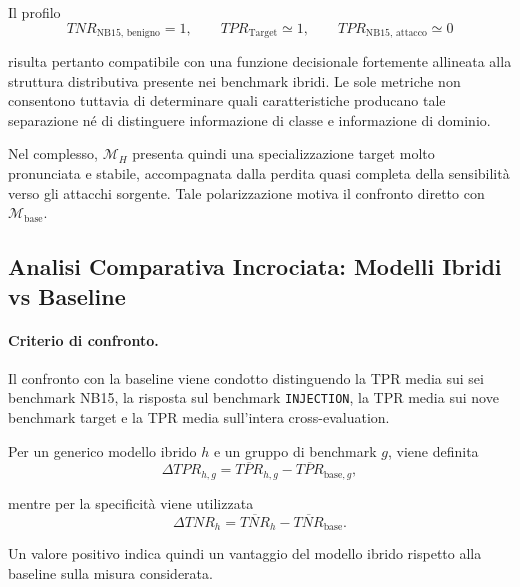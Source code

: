 Il profilo
\[
    TNR_{\text{NB15, benigno}}=1,
    \qquad
    TPR_{\text{Target}}\simeq1,
    \qquad
    TPR_{\text{NB15, attacco}}\simeq0
\]

risulta pertanto compatibile con una funzione decisionale fortemente allineata alla struttura distributiva presente nei benchmark ibridi. 
Le sole metriche non consentono tuttavia di determinare quali caratteristiche producano tale separazione né di distinguere informazione di classe e informazione di dominio.

Nel complesso, $\mathcal{M}_{H}$ presenta quindi una specializzazione target molto pronunciata e stabile, accompagnata dalla perdita quasi completa della sensibilità verso gli attacchi sorgente. 
Tale polarizzazione motiva il confronto diretto con $\mathcal{M}_{\mathrm{base}}$.



\subsection{Analisi Comparativa Incrociata: Modelli Ibridi vs Baseline}
\label{subsec:analisi_incrociata_ibridi_baseline}

\paragraph{Criterio di confronto.}
Il confronto con la baseline viene condotto distinguendo la TPR media sui sei benchmark NB15, la risposta sul benchmark \texttt{INJECTION}, la TPR media sui nove benchmark target e la TPR media sull'intera cross-evaluation.

Per un generico modello ibrido $h$ e un gruppo di benchmark $g$, viene definita
\begin{equation}
    \Delta TPR_{h,g}
    =
    \overline{TPR}_{h,g}
    -
    \overline{TPR}_{\mathrm{base},g},
    \label{eq:delta_tpr_hybrid_baseline}
\end{equation}

mentre per la specificità viene utilizzata
\begin{equation}
    \Delta TNR_h
    =
    \overline{TNR}_{h}
    -
    \overline{TNR}_{\mathrm{base}}.
    \label{eq:delta_tnr_hybrid_baseline}
\end{equation}

Un valore positivo indica quindi un vantaggio del modello ibrido rispetto alla baseline sulla misura considerata.

